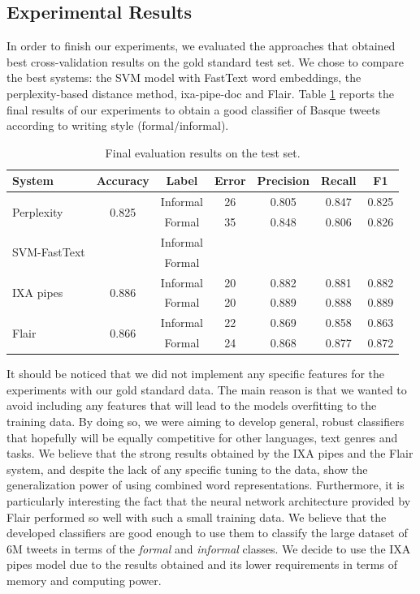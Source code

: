 \documentclass[information,article,submit,moreauthors,pdftex,10pt,a4paper]{Definitions/mdpi}
\begin{document}
\subsection{Experimental Results}\label{sec:experimental-results}

In order to finish our experiments, we evaluated the approaches that obtained best cross-validation results on the gold standard test set. We chose to compare the best systems: the SVM model with FastText word embeddings, the perplexity-based distance method, ixa-pipe-doc and Flair. Table \ref{tab:testresults} reports the final results of our experiments to obtain a good classifier of Basque tweets according to writing style (formal/informal).

\begin{table}[H]
  \centering
  \begin{tabular}{lcccccc} \hline
    System & Accuracy & Label & Error & Precision & Recall & F1 \\ \hline \hline
    \multirow{2}{*}{Perplexity} & \multirow{2}{*}{0.825} & Informal & 26 & 0.805 & 0.847 & 0.825 \\
    & & Formal & 35 & 0.848 & 0.806 & 0.826 \\ \hline \hline
    \multirow{2}{*}{SVM-FastText} & \multirow{2}{*}{} & Informal &  &  &  &  \\
    & & Formal & &  &  &  \\ \hline \hline
    \multirow{2}{*}{IXA pipes} & \multirow{2}{*}{0.886} & Informal & 20 & 0.882 & 0.881 & 0.882 \\
    & & Formal & 20 & 0.889 & 0.888 & 0.889 \\ \hline \hline
    \multirow{2}{*}{Flair} & \multirow{2}{*}{0.866} & Informal & 22 & 0.869 & 0.858 & 0.863 \\
    & & Formal & 24 & 0.868 & 0.877 & 0.872 \\ \hline
 \end{tabular}
  \caption{Final evaluation results on the test set.}
  \label{tab:testresults}
\end{table}

It should be noticed that we did not implement any specific features for the experiments with our gold standard data. The main reason is that we wanted to avoid including any features that will lead to the models overfitting to the training data. By doing so, we were aiming to develop general, robust classifiers that hopefully will be equally competitive for other languages, text genres and tasks. We believe that the strong results obtained by the IXA pipes and the Flair system, and despite the lack of any specific tuning to the data, show the generalization power of using combined word representations. Furthermore, it is particularly interesting the fact that the neural network architecture provided by Flair performed so well with such a small training data. We believe that the developed classifiers are good enough to use them to classify the large dataset of 6M tweets in terms of the \emph{formal} and \emph{informal} classes. We decide to use the IXA pipes model due to the results obtained and its lower requirements in terms of memory and computing power.
\end{document}
